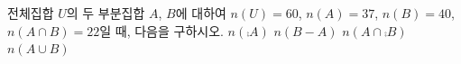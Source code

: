 전체집합 $U$의 두 부분집합 $A$, $B$에 대하여 $n(U)=60$, $n(A)=37$, $n(B)=40$, $n(A\cap B)=22$일 때, 다음을 구하시오.
 $n(\comp{A})$
 $n(B-A)$
 $n(A\cap\comp{B})$
 $n(A\cup B)$
